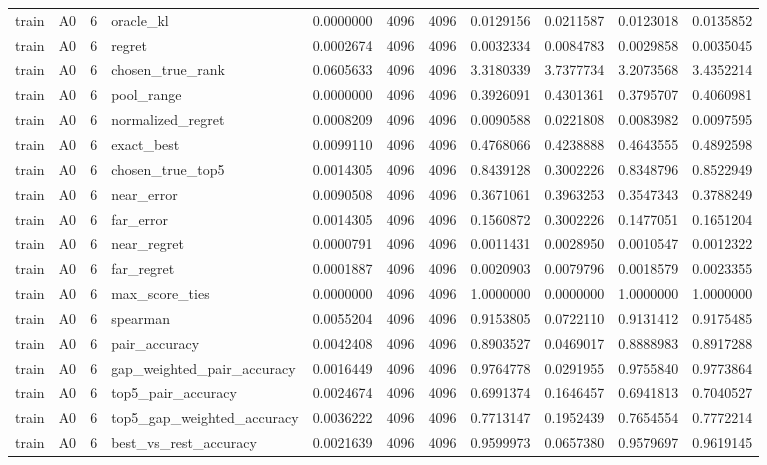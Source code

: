 \begin{tabular}{llrlrrrrrrr}
train & A0 & 6 & oracle_kl & 0.0000000 & 4096 & 4096 & 0.0129156 & 0.0211587 & 0.0123018 & 0.0135852 \\
train & A0 & 6 & regret & 0.0002674 & 4096 & 4096 & 0.0032334 & 0.0084783 & 0.0029858 & 0.0035045 \\
train & A0 & 6 & chosen_true_rank & 0.0605633 & 4096 & 4096 & 3.3180339 & 3.7377734 & 3.2073568 & 3.4352214 \\
train & A0 & 6 & pool_range & 0.0000000 & 4096 & 4096 & 0.3926091 & 0.4301361 & 0.3795707 & 0.4060981 \\
train & A0 & 6 & normalized_regret & 0.0008209 & 4096 & 4096 & 0.0090588 & 0.0221808 & 0.0083982 & 0.0097595 \\
train & A0 & 6 & exact_best & 0.0099110 & 4096 & 4096 & 0.4768066 & 0.4238888 & 0.4643555 & 0.4892598 \\
train & A0 & 6 & chosen_true_top5 & 0.0014305 & 4096 & 4096 & 0.8439128 & 0.3002226 & 0.8348796 & 0.8522949 \\
train & A0 & 6 & near_error & 0.0090508 & 4096 & 4096 & 0.3671061 & 0.3963253 & 0.3547343 & 0.3788249 \\
train & A0 & 6 & far_error & 0.0014305 & 4096 & 4096 & 0.1560872 & 0.3002226 & 0.1477051 & 0.1651204 \\
train & A0 & 6 & near_regret & 0.0000791 & 4096 & 4096 & 0.0011431 & 0.0028950 & 0.0010547 & 0.0012322 \\
train & A0 & 6 & far_regret & 0.0001887 & 4096 & 4096 & 0.0020903 & 0.0079796 & 0.0018579 & 0.0023355 \\
train & A0 & 6 & max_score_ties & 0.0000000 & 4096 & 4096 & 1.0000000 & 0.0000000 & 1.0000000 & 1.0000000 \\
train & A0 & 6 & spearman & 0.0055204 & 4096 & 4096 & 0.9153805 & 0.0722110 & 0.9131412 & 0.9175485 \\
train & A0 & 6 & pair_accuracy & 0.0042408 & 4096 & 4096 & 0.8903527 & 0.0469017 & 0.8888983 & 0.8917288 \\
train & A0 & 6 & gap_weighted_pair_accuracy & 0.0016449 & 4096 & 4096 & 0.9764778 & 0.0291955 & 0.9755840 & 0.9773864 \\
train & A0 & 6 & top5_pair_accuracy & 0.0024674 & 4096 & 4096 & 0.6991374 & 0.1646457 & 0.6941813 & 0.7040527 \\
train & A0 & 6 & top5_gap_weighted_accuracy & 0.0036222 & 4096 & 4096 & 0.7713147 & 0.1952439 & 0.7654554 & 0.7772214 \\
train & A0 & 6 & best_vs_rest_accuracy & 0.0021639 & 4096 & 4096 & 0.9599973 & 0.0657380 & 0.9579697 & 0.9619145 \\

\end{tabular}
